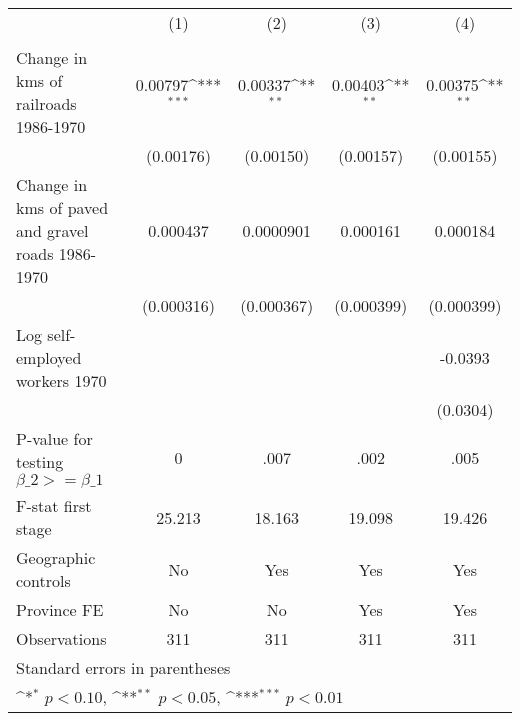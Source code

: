 {
\def\sym#1{\ifmmode^{#1}\else\(^{#1}\)\fi}
\begin{tabular}{l*{4}{c}}
\hline\hline
                &\multicolumn{1}{c}{(1)}&\multicolumn{1}{c}{(2)}&\multicolumn{1}{c}{(3)}&\multicolumn{1}{c}{(4)}\\
                &\multicolumn{1}{c}{}&\multicolumn{1}{c}{}&\multicolumn{1}{c}{}&\multicolumn{1}{c}{}\\
\hline
Change in kms of railroads 1986-1970&  0.00797\sym{***}&  0.00337\sym{**} &  0.00403\sym{**} &  0.00375\sym{**} \\
                &(0.00176)         &(0.00150)         &(0.00157)         &(0.00155)         \\
[1em]
Change in kms of paved and gravel roads 1986-1970& 0.000437         &0.0000901         & 0.000161         & 0.000184         \\
                &(0.000316)         &(0.000367)         &(0.000399)         &(0.000399)         \\
[1em]
Log self-employed workers 1970&                  &                  &                  &  -0.0393         \\
                &                  &                  &                  & (0.0304)         \\
\hline
P-value for testing $\beta\_{2} >= \beta\_{1}$&        0         &     .007         &     .002         &     .005         \\
F-stat first stage&   25.213         &   18.163         &   19.098         &   19.426         \\
Geographic controls&       No         &      Yes         &      Yes         &      Yes         \\
Province FE     &       No         &       No         &      Yes         &      Yes         \\
Observations    &      311         &      311         &      311         &      311         \\
\hline\hline
\multicolumn{5}{l}{\footnotesize Standard errors in parentheses}\\
\multicolumn{5}{l}{\footnotesize \sym{*} \(p<0.10\), \sym{**} \(p<0.05\), \sym{***} \(p<0.01\)}\\
\end{tabular}
}
